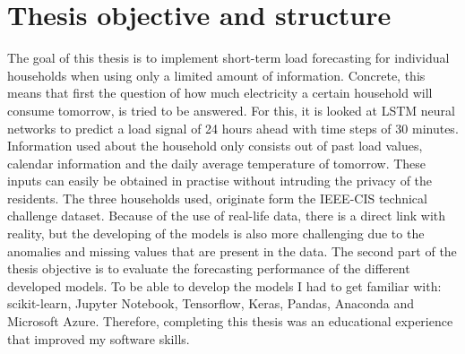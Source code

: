 \section{Thesis objective and structure}
The goal of this thesis is to implement short-term load forecasting for individual households when using only a limited amount of information. Concrete, this means that first the question of how much electricity a certain household will consume tomorrow, is tried to be answered. For this, it is looked at LSTM neural networks to predict a load signal of 24 hours ahead with time steps of 30 minutes. Information used about the household only consists out of past load values, calendar information and the daily average temperature of tomorrow. These inputs can easily be obtained in practise without intruding the privacy of the residents. The three households used, originate form the IEEE-CIS technical challenge dataset. Because of the use of real-life data, there is a direct link with reality, but the developing of the models is also more challenging due to the anomalies and missing values that are present in the data. The second part of the thesis objective is to evaluate the forecasting performance of the different developed models. To be able to develop the models I had to get familiar with: scikit-learn, Jupyter Notebook, Tensorflow, Keras, Pandas, Anaconda and Microsoft Azure. Therefore, completing this thesis was an educational experience that improved my software skills.\\ 

